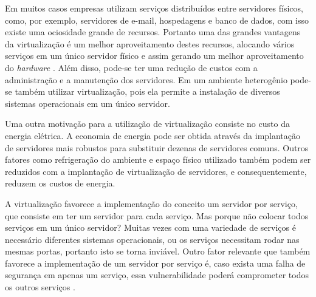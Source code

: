 Em muitos casos empresas utilizam serviços distribuídos entre servidores físicos, como, por exemplo, servidores de e-mail, hospedagens e 
banco de dados, com isso existe uma ociosidade grande de recursos. Portanto uma das grandes vantagens da virtualização é um melhor 
aproveitamento destes recursos, alocando vários serviços em um único servidor físico e assim gerando um melhor aproveitamento do \textit{hardware} 
\cite{moreira2006}. Além disso, pode-se ter uma redução de custos com a administração e a manutenção dos servidores. Em um ambiente 
heterogênio pode-se também utilizar virtualização, pois ela permite a instalação de diversos sistemas operacionais em um único servidor.

Uma outra motivação para a utilização de virtualização consiste no custo da energia elétrica. A economia de energia pode ser obtida através 
da implantação de servidores mais robustos para substituir dezenas de servidores comuns. Outros fatores como refrigeração do ambiente e 
espaço físico utilizado também podem ser reduzidos com a implantação de virtualização de servidores, e consequentemente, reduzem os 
custos de energia.

A virtualização favorece a implementação do conceito um servidor por serviço, que consiste em ter um servidor para cada serviço.
Mas porque não colocar todos serviços em um único servidor? Muitas vezes com uma variedade de serviços é necessário diferentes 
sistemas operacionais, ou os serviços necessitam rodar nas mesmas portas, portanto isto se torna inviável. Outro fator relevante que 
também favorece a implementação de um servidor por serviço é, caso exista uma falha de segurança em apenas um serviço, essa 
vulnerabilidade poderá comprometer todos os outros serviços \cite{carissimi2008}.




